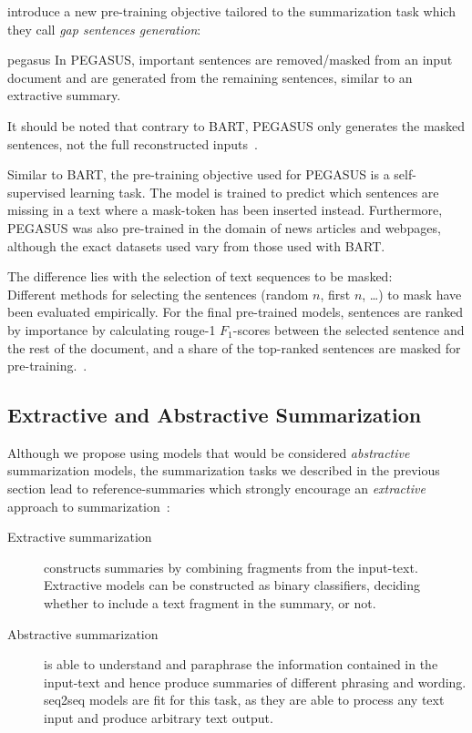 \citeauthor*{pegasus} introduce a new pre-training objective tailored
to the summarization task which they call \emph{gap sentences generation}:
\begin{displaycquote}[11328]{pegasus}
In PEGASUS, important sentences are removed/masked from an input document
and are generated \textelp{} from the remaining sentences,
similar to an extractive summary.
\end{displaycquote}
It should be noted that contrary to BART, PEGASUS only generates the masked sentences,
not the full reconstructed inputs~\parencite[11331]{pegasus}.

Similar to BART, the pre-training objective used for PEGASUS is a self-supervised learning task.
The model is trained to predict which sentences are missing in a text
where a mask-token has been inserted instead.
Furthermore, PEGASUS was also pre-trained in the domain of news articles and webpages, %
although the exact datasets used vary from those used with BART.

The difference lies with the selection of text sequences to be masked:\\
Different methods for selecting the sentences (random \(n\), first \(n\), \ldots{})
to mask have been evaluated empirically. %
For the final pre-trained models, sentences are ranked by importance by
calculating \acs*{rouge}-1 \(F_1\)-scores between the selected sentence and the rest of the document,
and a share of the top-ranked sentences are masked for pre-training.~\parencite[11330,11333]{pegasus}.

\subsection{Extractive and Abstractive Summarization}

Although we propose using models that would be considered \emph{abstractive} summarization models,
the summarization tasks we described in the previous section lead to
reference-summaries which strongly encourage an \emph{extractive} approach to summarization~\parencite[541-542]{summarization_critical_evaluation}:
\begin{description}
\item[Extractive summarization] constructs summaries by combining fragments from the input-text.
      Extractive models can be constructed as binary classifiers,
      deciding whether to include a text fragment in the summary, or not.
\item[Abstractive summarization] is able to understand and paraphrase the information contained in the input-text and hence produce summaries of different phrasing and wording.
      \Acl{seq2seq} models are fit for this task,
      as they are able to process any text input and produce arbitrary text output.
\end{description}

